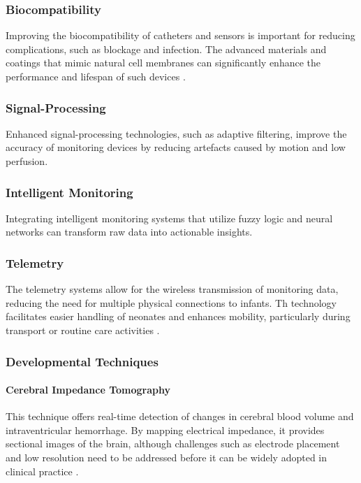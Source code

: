\documentclass[12pt,journal,compsoc]{IEEEtran}
\begin{document}
\subsubsection{Biocompatibility}
Improving the biocompatibility of catheters and sensors is important for reducing complications, such as blockage and infection. The advanced materials and coatings that mimic natural cell membranes can significantly enhance the performance and lifespan of such devices \cite{IEEEhowto:nicklin}.

\subsubsection{Signal-Processing}
Enhanced signal-processing technologies, such as adaptive filtering, improve the accuracy of monitoring devices by reducing artefacts caused by motion and low perfusion.  

\subsubsection{Intelligent Monitoring}
Integrating intelligent monitoring systems that utilize fuzzy logic and neural networks can transform raw data into actionable insights.  

\subsubsection{Telemetry}
The telemetry systems allow for the wireless transmission of monitoring data, reducing the need for multiple physical connections to infants. Th technology facilitates easier handling of neonates and enhances mobility, particularly during transport or routine care activities \cite{IEEEhowto:nicklin}.

\subsubsection{Developmental Techniques}

\paragraph{Cerebral Impedance Tomography}
This technique offers real-time detection of changes in cerebral blood volume and intraventricular hemorrhage. By mapping electrical impedance, it provides sectional images of the brain, although challenges such as electrode placement and low resolution need to be addressed before it can be widely adopted in clinical practice \cite{IEEEhowto:nicklin}.
\end{document}
